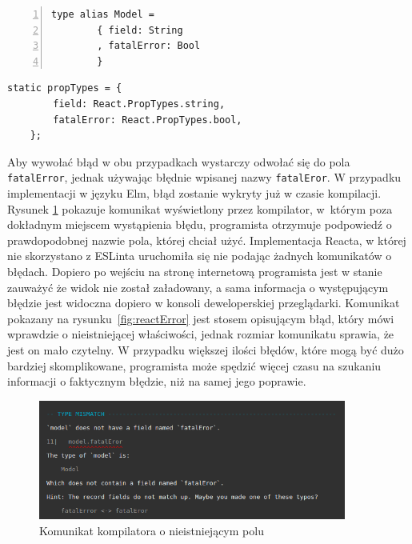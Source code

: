 \begin{minipage}{.45\textwidth}
	\begin{lstlisting}[style=elm-style,label = listing:elmmodel, numbers=left, stepnumber=1]
	type alias Model =
		{ field: String
		, fatalError: Bool
		}
	\end{lstlisting}
\end{minipage}\hfill
\begin{minipage}{.45\textwidth}
	\begin{lstlisting}[style=JavaScript,firstnumber=1,label=listing:reactprops]
	static propTypes = {
		field: React.PropTypes.string,
		fatalError: React.PropTypes.bool,
	};
	\end{lstlisting}
\end{minipage}

Aby wywołać błąd w obu przypadkach wystarczy odwołać się do pola \lstinline{fatalError}, jednak używając błędnie wpisanej nazwy \lstinline{fatalEror}. W przypadku implementacji w języku Elm, błąd zostanie wykryty już w czasie kompilacji. Rysunek \ref{fig:elmError} pokazuje komunikat wyświetlony przez kompilator, w~którym poza dokładnym miejscem wystąpienia błędu, programista otrzymuje podpowiedź o prawdopodobnej nazwie pola, której chciał użyć. Implementacja Reacta, w której nie skorzystano z ESLinta uruchomiła się nie podając żadnych komunikatów o błędach. Dopiero po wejściu na stronę internetową programista jest w stanie zauważyć że widok nie został załadowany, a sama informacja o występującym błędzie jest widoczna dopiero w konsoli deweloperskiej przeglądarki. Komunikat pokazany na rysunku~\ref{fig:reactError} jest stosem opisującym błąd, który mówi wprawdzie o nieistniejącej właściwości, jednak rozmiar komunikatu sprawia, że jest on mało czytelny. W przypadku większej ilości błędów, które mogą być dużo bardziej skomplikowane, programista może spędzić więcej czasu na szukaniu informacji o faktycznym błędzie, niż na samej jego poprawie.

\begin{figure}[h]
	\centering
	\includegraphics[width=0.9\textwidth]{images/elm_error}
	\caption{Komunikat kompilatora o nieistniejącym polu}
	\label{fig:elmError}
\end{figure}

